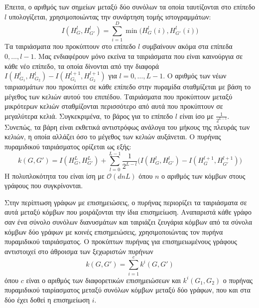 Έπειτα, ο αριθμός των σημείων μεταξύ δύο συνόλων τα οποία ταυτίζονται στο επίπεδο $l$ υπολογίζεται, χρησιμοποιώντας την συνάρτηση τομής ιστογραμμάτων:
\begin{equation}
  I(H_G^l,H_{G'}^l) = \sum_{i=1}^D \min\big(H_G^l(i),H_{G'}^l(i)\big)
\end{equation}
Τα ταιριάσματα που προκύπτουν στο επίπεδο $l$ συμβαίνουν ακόμα στα επίπεδα $0, \ldots, l-1$.
Μας ενδιαφέρουν μόνο εκείνα τα ταιριάσματα που είναι καινούργια σε κάθε νέο επίπεδο, τα οποία δίνονται από την διαφορά $I(H_{G_1}^l,H_{G_2}^l) - I(H_{G_1}^{l+1},H_{G_2}^{l+1})$ για $l=0,\ldots,L-1$.
Ο αριθμός των νέων ταιριασμάτων που προκύπτει σε κάθε επίπεδο στην πυραμίδα σταθμίζεται με βάση το μέγεθος των κελιών αυτού του επιπέδου.
Ταιριάσματα που προκύπτουν μεταξύ μικρότερων κελιών σταθμίζονται περισσότερο από αυτά που προκύπτουν σε μεγαλύτερα κελιά.
Συγκεκριμένα, το βάρος για το επίπεδο $l$ είναι ίσο με $\frac{1}{2^{L-l}}$.
Συνεπώς, τα βάρη είναι εκθετικά αντιστρόφως ανάλογα του μήκους της πλευράς των κελιών, η οποία αλλάζει όσο το μέγεθος των κελιών αυξάνεται.
Ο πυρήνας πυραμιδικού ταιριάσματος ορίζεται ως εξής:
\begin{equation}
  k(G,G') = I(H_G^L,H_{G'}^L) + \sum_{l=0}^{L-1} \frac{1}{2^{L-l}}\big(I(H_G^l,H_{G'}^l) - I(H_G^{l+1},H_{G'}^{l+1})\big)
\end{equation} 
Η πολυπλοκότητα του είναι ίση με $\mathcal{O}(dnL)$ όπου $n$ ο αριθμός των κόμβων στους γράφους που συγκρίνονται.

Στην περίπτωση γράφων με επισημειώσεις, ο πυρήνας περιορίζει τα ταιριάσματα σε αυτά μεταξύ κόμβων που μοιράζονται την ίδια επισημείωση.
Αναπαριστά κάθε γράφο σαν ένα σύνολο συνόλων διανυσμάτων και ταιριάζει ζευγάρια κόμβων από τα σύνολα κόμβων δύο γράφων με κοινές επισημειώσεις, χρησιμοποιώντας τον πυρήνα πυραμιδικού ταιριάσματος.
Ο προκύπτων πυρήνας για επισημειωμένους γράφους αντιστοιχεί στο άθροισμα των ξεχωριστών πυρήνων
\begin{equation}
    k(G, G') = \sum_{i=1}^c k^i(G,G')
\end{equation}
όπου $c$ είναι ο αριθμός των διαφορετικών επισημειώσεων και $k^i(G_1,G_2)$ ο πυρήνας πυραμιδικού ταιρίασματος μεταξύ συνόλων κόμβων μεταξύ δύο γράφων, που και στα δύο έχει δοθεί η επισημείωση $i$.


